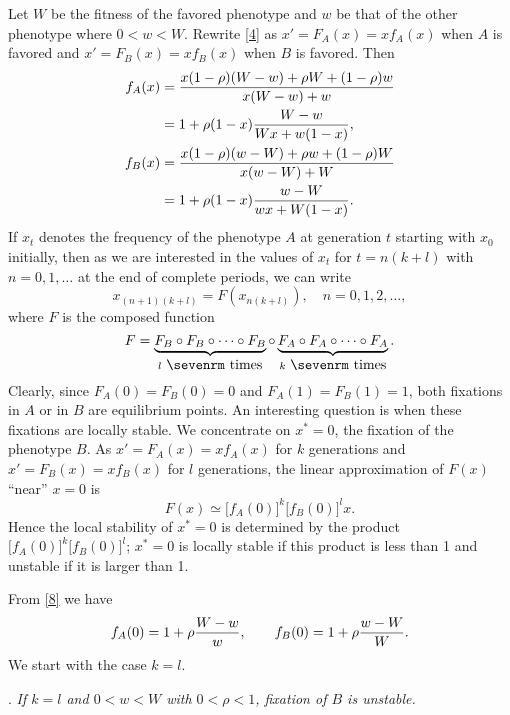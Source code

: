 \documentclass[9pt,twocolumn,twoside,lineno]{pnas-new}
\newcommand{\an}[1]{\begin{align}#1\end{align}}
\begin{document}
Let $W$ be the fitness of the favored phenotype and $w$ be that of the other phenotype where $0<w<W$. Rewrite \eqref{4} as $x'=F_A(x)=xf_A(x)$ when $A$ is favored and $x'=F_B(x)=xf_B(x)$ when $B$ is favored. Then
 \begin{equation}
 \an{
f_A(x) &= {x(1-\rho)(W-w) +\rho W +(1-\rho)w\over x(W-w) +w}\\
&= 1+\rho(1-x){W-w\over Wx +w(1-x)},\\
f_B(x) &= {x(1-\rho)(w-W) +\rho w +(1-\rho)W\over x(w-W) +W} \\
&= 1+\rho(1-x){w-W\over wx+W(1-x)}.
}\label{8}\end{equation}
  \noindent If $x_t$ denotes the frequency of  the phenotype $A$ at generation $t$ starting with $x_0$ initially, then as we are interested in the values of $x_t$ for $t=n(k+l)$ with $n=0,1,\dots$ at the end of complete periods, we can write
 \begin{equation}x_{(n+1)(k+l)}=F(x_{n(k+l)}),\quad n=0,1,2,\dots,\label{9}\end{equation}
  where $F$ is the composed function
\begin{equation}F=\underbrace{F_B\circ F_B \circ\cdots\circ F_B}_{l\ \hbox{\sevenrm times}} \circ\underbrace{F_A\circ F_A \circ\cdots\circ F_A}_{k\ \hbox{\sevenrm times}}.\label{10}\end{equation}
  Clearly, since $F_A(0) =F_B(0) =0$ and $F_A(1) =F_B(1) =1$, both fixations in $A$ or in $B$ are equilibrium points. An interesting question is when these fixations are locally stable. We concentrate on $x^*=0$, the fixation of the phenotype $B$. As $x'=F_A(x) =xf_A(x)$ for $k$ generations and $x'=F_B(x) =xf_B(x)$ for $l$ generations, the linear approximation of $F(x)$ ``near'' $x=0$ is
 \begin{equation}F(x) \simeq\bigl[f_A(0)\bigr]^k \bigl[f_B(0)\bigr]^lx.\label{11}\end{equation}
   Hence the local stability of $x^*=0$ is determined by the product $\bigl[f_A(0)\bigr]^k \bigl[f_B(0)\bigr]^l$;  $x^*=0$  is locally stable if this product  is less than 1 and unstable if it is larger than 1.
   
   From \eqref{8} we have
   \begin{equation}
   f_A(0) = 1+\rho{W-w\over w},\qquad
   f_B(0) = 1+\rho{w-W\over W}.\label{12}\end{equation}
   We start with the case $k=l$.
   \medskip
   
   . {\sl If $k=l$ and $0<w<W$ with $0<\rho<1$, fixation of $B$ is unstable.}\par
   \medskip
   
\end{document}
